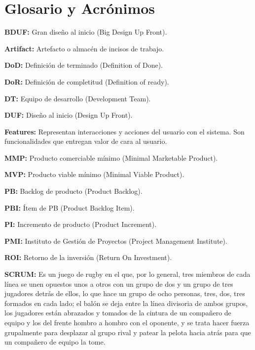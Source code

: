 \chapter{Glosario y Acrónimos}


  \begin{description}  
  
  \item {\textbf{BDUF:} Gran diseño al inicio (Big Design Up Front).}
  
  \item {\textbf{Artifact:} Artefacto o almacén de incisos de trabajo.}  
  
  \item {\textbf{DoD:} Definición de terminado (Definition of Done).}
  
  \item {\textbf{DoR:} Definición de completitud (Definition of ready).}
  
  \item {\textbf{DT:} Equipo de desarrollo (Development Team).}
  
  \item {\textbf{DUF:} Diseño al inicio (Design Up Front).}

  \item {\textbf{Features:} Representan interacciones y acciones del usuario con el sistema. Son funcionalidades que entregan valor de cara al usuario.}
  
  \item {\textbf{MMP:} Producto comerciable mínimo (Minimal Marketable Product).}
  
  \item {\textbf{MVP:} Producto viable mínimo (Minimal Viable Product).}
  
  \item {\textbf{PB:} Backlog de producto (Product Backlog).}
  
  \item {\textbf{PBI:} Ítem de PB (Product Backlog Item).}
  
  \item {\textbf{PI:} Incremento de producto (Product Increment).}
  
  \item {\textbf{PMI:} Instituto de Gestión de Proyectos (Project Management Institute).}
  
  \item {\textbf{ROI:} Retorno de la inversión (Return On Investment).}
  
  \item {\textbf{SCRUM:} Es un juego de rugby en el que, por lo general, tres miembros de cada línea se unen opuestos unos a otros con un grupo de dos y un grupo de tres jugadores detrás de ellos, lo que hace un grupo de ocho personas, tres, dos, tres formados en cada lado; el balón se deja entre la línea divisoria de ambos grupos, los jugadores están abrazados y tomados de la cintura de un compañero de equipo y los del frente hombro a hombro con el oponente, y se trata hacer fuerza grupalmente para desplazar al grupo rival y patear la pelota hacia atrás para que un compañero de equipo la tome.}
  

\end{description}
